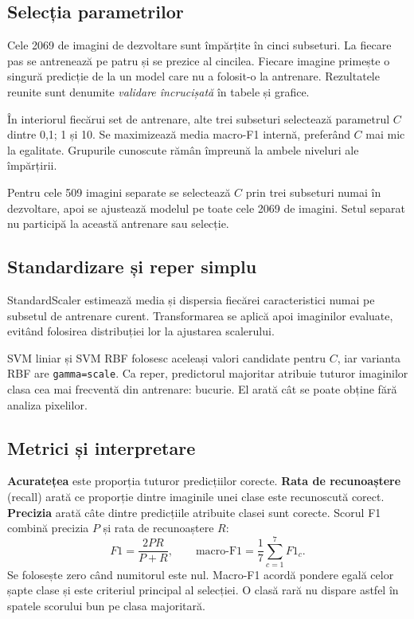 \documentclass[conference]{IEEEtran}
\begin{document}
\subsection{Selecția parametrilor}
Cele 2069 de imagini de dezvoltare sunt împărțite în cinci subseturi. La fiecare pas se antrenează pe patru și se prezice al cincilea. Fiecare imagine primește o singură predicție de la un model care nu a folosit-o la antrenare. Rezultatele reunite sunt denumite \emph{validare încrucișată} în tabele și grafice.

În interiorul fiecărui set de antrenare, alte trei subseturi selectează parametrul $C$ dintre 0,1; 1 și 10. Se maximizează media macro-F1 internă, preferând $C$ mai mic la egalitate. Grupurile cunoscute rămân împreună la ambele niveluri ale împărțirii.

Pentru cele 509 imagini separate se selectează $C$ prin trei subseturi numai în dezvoltare, apoi se ajustează modelul pe toate cele 2069 de imagini. Setul separat nu participă la această antrenare sau selecție.

\subsection{Standardizare și reper simplu}
StandardScaler estimează media și dispersia fiecărei caracteristici numai pe subsetul de antrenare curent. Transformarea se aplică apoi imaginilor evaluate, evitând folosirea distribuției lor la ajustarea scalerului.

SVM liniar și SVM RBF folosesc aceleași valori candidate pentru $C$, iar varianta RBF are \texttt{gamma=scale}. Ca reper, predictorul majoritar atribuie tuturor imaginilor clasa cea mai frecventă din antrenare: bucurie. El arată cât se poate obține fără analiza pixelilor.

\subsection{Metrici și interpretare}
\textbf{Acuratețea} este proporția tuturor predicțiilor corecte. \textbf{Rata de recunoaștere} (recall) arată ce proporție dintre imaginile unei clase este recunoscută corect. \textbf{Precizia} arată câte dintre predicțiile atribuite clasei sunt corecte. Scorul F1 combină precizia $P$ și rata de recunoaștere $R$:
\begin{equation}
 F1=\frac{2PR}{P+R},\qquad
 \text{macro-F1}=\frac{1}{7}\sum_{c=1}^{7}F1_c.
\end{equation}
Se folosește zero când numitorul este nul. Macro-F1 acordă pondere egală celor șapte clase și este criteriul principal al selecției. O clasă rară nu dispare astfel în spatele scorului bun pe clasa majoritară.
\end{document}
